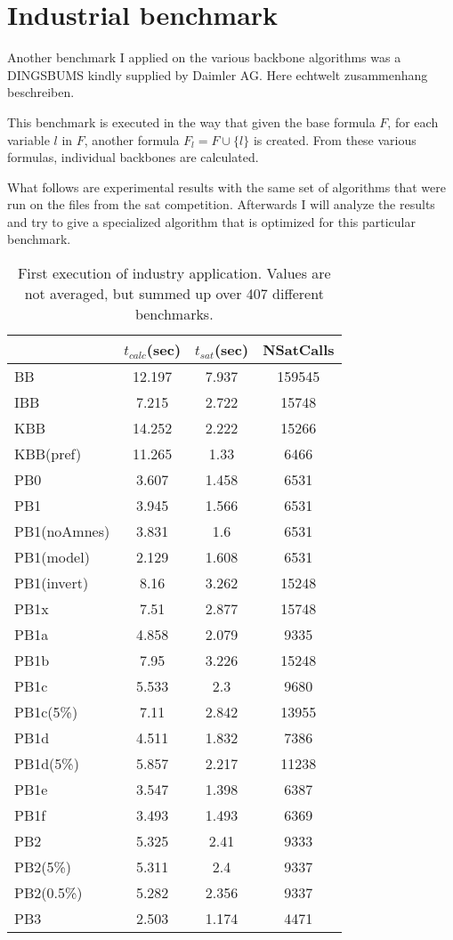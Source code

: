 \section{Industrial benchmark}

Another benchmark I applied on the various backbone algorithms was a DINGSBUMS kindly supplied by Daimler AG. Here echtwelt zusammenhang beschreiben.

This benchmark is executed in the way that given the base formula $F$, for each variable $l$ in $F$, another formula $F_l = F \cup \{l\}$ is created. From these various formulas, individual backbones are calculated.

What follows are experimental results with the same set of algorithms that were run on the files from the sat competition. Afterwards I will analyze the results and try to give a specialized algorithm that is optimized for this particular benchmark.

\begin{table}[ht]
\label{tab:vonThore1} %
\begin{tabular}{l| c c c }
&	$t_{calc}$(sec) &	$t_{sat}$(sec)	& NSatCalls \\
\hline
BB & 12.197 & 7.937 & 159545 \\
IBB & 7.215 & 2.722 & 15748 \\
KBB & 14.252 & 2.222 & 15266 \\
KBB(pref) & 11.265 & 1.33 & 6466 \\
PB0 & 3.607 & 1.458 & 6531 \\
PB1 & 3.945 & 1.566 & 6531 \\
PB1(noAmnes) & 3.831 & 1.6 & 6531 \\
PB1(model) & 2.129 & 1.608 & 6531 \\
PB1(invert) & 8.16 & 3.262 & 15248 \\
PB1x & 7.51 & 2.877 & 15748 \\
PB1a & 4.858 & 2.079 & 9335 \\
PB1b & 7.95 & 3.226 & 15248 \\
PB1c & 5.533 & 2.3 & 9680 \\
PB1c(5\%) & 7.11 & 2.842 & 13955 \\
PB1d & 4.511 & 1.832 & 7386 \\
PB1d(5\%) & 5.857 & 2.217 & 11238 \\
PB1e & 3.547 & 1.398 & 6387 \\
PB1f & 3.493 & 1.493 & 6369 \\
PB2 & 5.325 & 2.41 & 9333 \\
PB2(5\%) & 5.311 & 2.4 & 9337 \\
PB2(0.5\%) & 5.282 & 2.356 & 9337 \\
PB3 & 2.503 & 1.174 & 4471
\end{tabular}
\caption{First execution of industry application. Values are not averaged, but summed up over 407 different benchmarks.}
\end{table}

